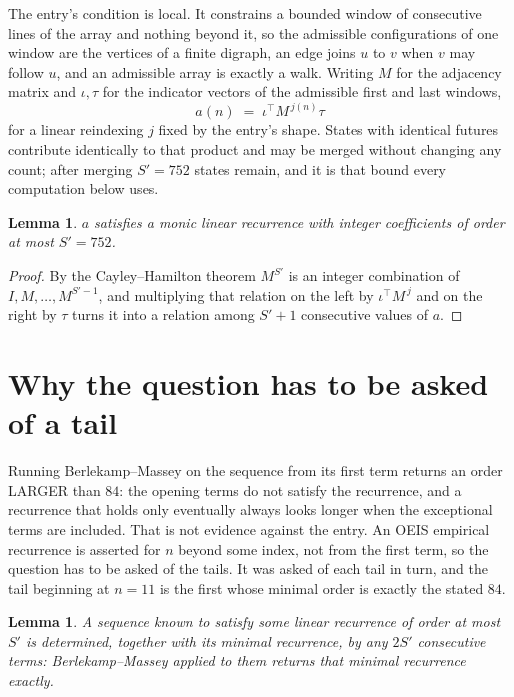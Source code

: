 \documentclass[11pt,a4paper]{article}
\theoremstyle{plain}
\newtheorem{lemma}[theorem]{Lemma}
\theoremstyle{definition}
\begin{document}
The entry's condition is local. It constrains a bounded window of consecutive lines of the
array and nothing beyond it, so the admissible configurations of one window are the vertices of
a finite digraph, an edge joins $u$ to $v$ when $v$ may follow $u$, and an admissible array is
exactly a walk. Writing $M$ for the adjacency matrix and $\iota,\tau$ for the indicator vectors
of the admissible first and last windows,
\[
a(n)\;=\;\iota^{\!\top}M^{\,j(n)}\tau
\]
for a linear reindexing $j$ fixed by the entry's shape. States with identical futures
contribute identically to that product and may be merged without changing any count; after
merging $S'=752$ states remain, and it is that bound every computation below uses.

\begin{lemma}\label{lem:cf}
$a$ satisfies a monic linear recurrence with integer coefficients of order at most $S'=752$.
\end{lemma}

\begin{proof}
By the Cayley--Hamilton theorem $M^{S'}$ is an integer combination of $I,M,\dots,M^{S'-1}$,
and multiplying that relation on the left by $\iota^{\!\top}M^{\,j}$ and on the right by
$\tau$ turns it into a relation among $S'+1$ consecutive values of $a$.
\end{proof}

\section{Why the question has to be asked of a tail}

Running Berlekamp--Massey on the sequence from its first term returns an order LARGER than $84$: the opening terms do not satisfy the recurrence, and a recurrence that holds only eventually always looks longer when the exceptional terms are included. That is not evidence against the entry. An OEIS empirical recurrence is asserted for $n$ beyond some index, not from the first term, so the question has to be asked of the tails. It was asked of each tail in turn, and the tail beginning at $n=11$ is the first whose minimal order is exactly the stated $84$.

\begin{lemma}\label{lem:bm}
A sequence known to satisfy some linear recurrence of order at most $S'$ is determined,
together with its minimal recurrence, by any $2S'$ consecutive terms: Berlekamp--Massey applied
to them returns that minimal recurrence exactly.
\end{lemma}
\end{document}
